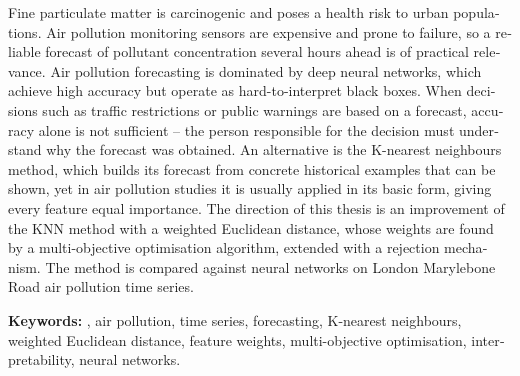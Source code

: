 \documentclass[]{VUMIFTemplateClass}
\begin{document}
    \begin{otherlanguage}{english}

    Fine particulate matter  is carcinogenic and poses a health risk to urban populations.
    Air pollution monitoring sensors are expensive and prone to failure, so a reliable forecast of pollutant concentration several hours ahead is of practical relevance.
    Air pollution forecasting is dominated by deep neural networks, which achieve high accuracy but operate as hard-to-interpret black boxes.
    When decisions such as traffic restrictions or public warnings are based on a forecast, accuracy alone is not sufficient -- the person responsible for the decision must understand why the forecast was obtained.
    An alternative is the K-nearest neighbours method, which builds its forecast from concrete historical examples that can be shown, yet in air pollution studies it is usually applied in its basic form, giving every feature equal importance.
    The direction of this thesis is an improvement of the KNN method with a weighted Euclidean distance, whose weights are found by a multi-objective optimisation algorithm, extended with a rejection mechanism.
    The method is compared against neural networks on London Marylebone Road air pollution time series.

    \textbf{Keywords:} , air pollution, time series, forecasting, K-nearest neighbours, weighted Euclidean distance, feature weights, multi-objective optimisation, interpretability, neural networks.

    \end{otherlanguage}


    \singlespacing

    \tableofcontents
    \onehalfspacing


\end{document}
